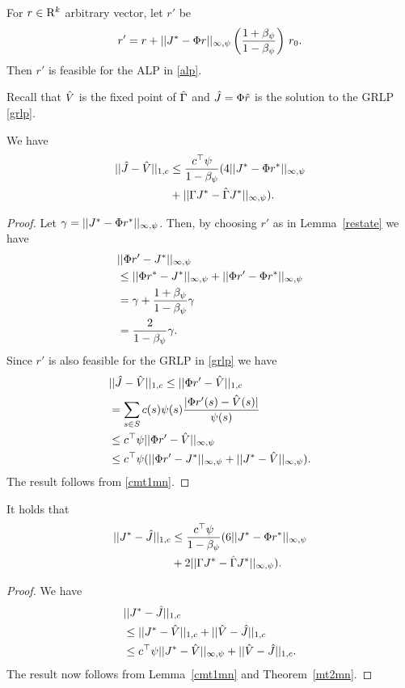\begin{lemma}\label{restate}
For  $r \in \mathrm{R}^k$ arbitrary vector, let $r'$ be
\begin{align}
 r'= r+||J^*-\Phi r||_{\infty,\psi} \left(\frac{1+\beta_{\psi}}{1-\beta_{\psi}}\right)\, r_0.
\end{align}
Then $r'$ is feasible for the ALP in \eqref{alp}. 
\end{lemma}
Recall that $\hat{V}$ is the fixed point of $\hat{\Gamma}$ and $\hat{J}=\Phi \hat{r}$ is the solution to the GRLP
\eqref{grlp}. 
\begin{theorem}\label{mt2mn}
We have
\begin{align}
||\hat{J}-\hat{V}||_{1,c}&\leq \frac{c^\top \psi}{1-\beta_\psi}(4||J^*-\Phi r^*||_{\infty,\psi}\nonumber\\
&+||\Gamma J^*-\hat{\Gamma} J^*||_{\infty,\psi}).
\end{align}
\end{theorem}
\begin{proof}
Let $\gamma=||J^*-\Phi r^*||_{\infty,\psi}$. 
Then, by choosing $r'$ as in Lemma~\ref{restate} we have
\begin{align*}
&||\Phi r'-J^*||_{\infty,\psi}\\&\leq ||\Phi r^*-J^*||_{\infty,\psi}+||\Phi r'-\Phi r^*||_{\infty,\psi}\nonumber\\
&=\gamma+\frac{1+\beta_\psi}{1-\beta_\psi}\gamma\nonumber\\
&=\frac{2}{1-\beta_\psi}\gamma.\nonumber
\end{align*}
Since $r'$ is also feasible for the GRLP in \eqref{grlp} we have
\begin{align}
&||\hat{J}-\hat{V}||_{1,c}\leq||\Phi r'-\hat{V}||_{1,c}\nonumber\\
&=\sum_{s\in S}c(s)\psi(s)\frac{|\Phi r'(s)-\hat{V}(s)|}{\psi(s)}\nonumber\\
&\leq c^\top \psi ||\Phi r'-\hat{V}||_{\infty,\psi}\nonumber\\
&\leq c^\top \psi (||\Phi r'-J^*||_{\infty,\psi}+||J^*-\hat{V}||_{\infty,\psi}).
\end{align}
The result follows from \cref{cmt1mn}.
\end{proof}
\begin{theorem}
\label{cmt2mn}
It holds that
\begin{align}\label{finalbndmn}
||J^*-\hj||_{1,c}&\leq\frac{c^\top\psi}{1-\beta_\psi}(6 ||J^*-\Phi r^*||_{\mn}\nn\\
&+2||\Gamma J^*-\hg J^*||_{\mn}).
\end{align}
\end{theorem}
\begin{proof}
We have
\begin{align}
&||J^*-\hat{J}||_{1,c}\nonumber\\
&\leq||J^*-\hat{V}||_{1,c}+||\hat{V}-\hat{J}||_{1,c}\nonumber\\
&\leq c^\top \psi ||J^*-\hat{V}||_{\infty,\psi}+||\hat{V}-\hat{J}||_{1,c}.\nonumber
\end{align}
The result now follows from Lemma~\ref{cmt1mn} and Theorem~\ref{mt2mn}.
\end{proof}

